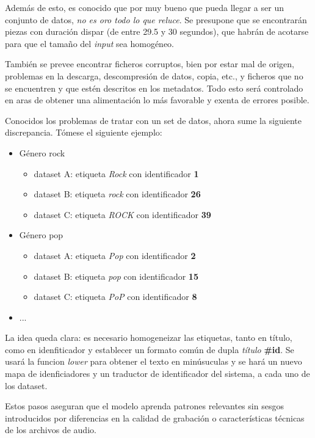 Además de esto, es conocido que por muy bueno que pueda llegar a ser un conjunto de datos, \emph{no es oro todo lo que reluce}. Se presupone que se encontrarán piezas con duración dispar (de entre 29.5 y 30 segundos), que habrán de acotarse para que el tamaño del \emph{input} sea homogéneo.

También se prevee encontrar ficheros corruptos, bien por estar mal de origen, problemas en la descarga, descompresión de datos, copia, etc., y ficheros que no se encuentren y que estén descritos en los metadatos. Todo esto será controlado en aras de obtener una alimentación lo más favorable y exenta de errores posible.

Conocidos los problemas de tratar con un set de datos, ahora sume la siguiente discrepancia. Tómese el siguiente ejemplo:

\begin{itemize}
    \item Género rock
    \begin{itemize}
        \item dataset A: etiqueta \emph{Rock} con identificador \textbf{1}
        \item dataset B: etiqueta \emph{rock} con identificador \textbf{26}
        \item dataset C: etiqueta \emph{ROCK} con identificador \textbf{39}
    \end{itemize}
    \item Género pop
    \begin{itemize}
        \item dataset A: etiqueta \emph{Pop} con identificador \textbf{2}
        \item dataset B: etiqueta \emph{pop} con identificador \textbf{15}
        \item dataset C: etiqueta \emph{PoP} con identificador \textbf{8}
    \end{itemize}
    \item ...
\end{itemize}

La idea queda clara: es necesario homogeneizar las etiquetas, tanto en título, como en idenfiticador y establecer un formato común de dupla \emph{título} \textbf{\#id}. Se usará la funcion \emph{lower} para obtener el texto en minúsuculas y se hará un nuevo mapa de idenficiadores y un traductor de identificador del sistema, a cada uno de los dataset.

Estos pasos aseguran que el modelo aprenda patrones relevantes sin sesgos introducidos por diferencias en la calidad de grabación o características técnicas de los archivos de audio.

